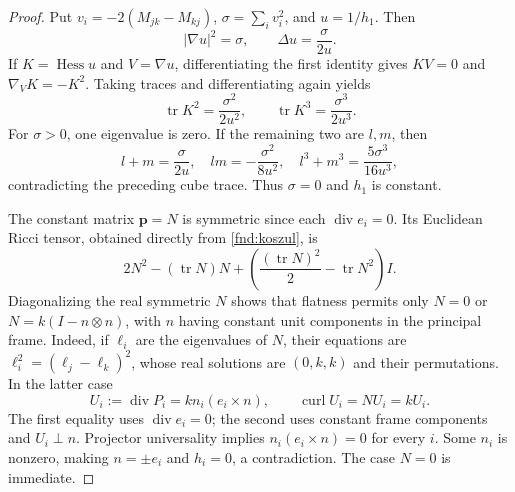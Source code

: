 \documentclass[11pt,a4paper]{article}
\numberwithin{equation}{section}
\theoremstyle{plain}
\theoremstyle{definition}
\theoremstyle{remark}
\begin{document}
\begin{proof}
Put $v_i=-2(M_{jk}-M_{kj})$, $\sigma=\sum_i v_i^2$, and $u=1/h_1$. Then
\begin{equation}\label{fnd:eikonal}
|\nabla u|^2=\sigma,\qquad \Delta u=\frac{\sigma}{2u}.
\end{equation}
If $K=\operatorname{Hess}u$ and $V=\nabla u$, differentiating the first identity gives $KV=0$ and $\nabla_VK=-K^2$. Taking traces and differentiating again yields
\[
\operatorname{tr}K^2=\frac{\sigma^2}{2u^2},\qquad
\operatorname{tr}K^3=\frac{\sigma^3}{2u^3}.
\]
For $\sigma>0$, one eigenvalue is zero. If the remaining two are $l,m$, then
\[
l+m=\frac{\sigma}{2u},\quad lm=-\frac{\sigma^2}{8u^2},\quad
l^3+m^3=\frac{5\sigma^3}{16u^3},
\]
contradicting the preceding cube trace. Thus $\sigma=0$ and $h_1$ is constant.

The constant matrix $\boldsymbol p=N$ is symmetric since each $\operatorname{div}e_i=0$. Its Euclidean Ricci tensor, obtained directly from \eqref{fnd:koszul}, is
\[
2N^2-(\operatorname{tr}N)N+
\left(\frac{(\operatorname{tr}N)^2}{2}-\operatorname{tr}N^2\right)I.
\]
Diagonalizing the real symmetric $N$ shows that flatness permits only $N=0$ or $N=k(I-n\otimes n)$, with $n$ having constant unit components in the principal frame. Indeed, if $\ell_i$ are the eigenvalues of $N$, their equations are $\ell_i^2=(\ell_j-\ell_k)^2$, whose real solutions are $(0,k,k)$ and their permutations. In the latter case
\[
U_i:=\operatorname{div}P_i=k n_i(e_i\times n),\qquad
\operatorname{curl}U_i=NU_i=kU_i.
\]
The first equality uses $\operatorname{div}e_i=0$; the second uses constant frame components and $U_i\perp n$. Projector universality implies $n_i(e_i\times n)=0$ for every $i$. Some $n_i$ is nonzero, making $n=\pm e_i$ and $h_i=0$, a contradiction. The case $N=0$ is immediate.
\end{proof}
\end{document}
